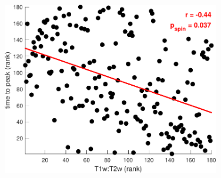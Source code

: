 \documentclass[sn-mathphys-num]{sn-jnl}%
\theoremstyle{thmstyleone}%
\theoremstyle{thmstyletwo}%
\theoremstyle{thmstylethree}%
\begin{document}
\begin{appendices}
\begin{figure}[!htb] 
	\centering
	\includegraphics[width=0.85\textwidth]{fig/supp_11.pdf}
	\caption{
	} \label{fig:supp_11}
\end{figure}






\end{appendices}



%
\end{document}
